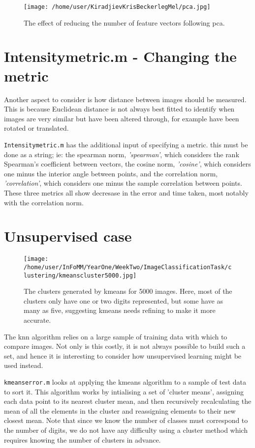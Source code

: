 \documentclass[12pt]{article}
\begin{document}
\begin{figure}
  \texttt{[image: /home/user/KiradjievKrisBeckerlegMel/pca.jpg]}
  \caption{The effect of reducing the number of feature vectors following pca.}
  \label{fig:errorfeat}
\end{figure}

\section{Intensitymetric.m - Changing the metric}

Another aspect to consider is how distance between images should be measured. This is because Euclidean distance is not always best fitted to identify when images are very similar but have been altered through, for example have been rotated or translated.

\texttt{Intensitymetric.m} has the additional input of specifying a metric. this must be done as a string; ie: the spearman norm, \emph{'spearman'}, which considers the rank Spearman's coefficient between vectors, the cosine norm, \emph{'cosine'}, which considers one minus the interior angle between points, and the correlation norm, \emph{'correlation'}, which considers one minus the sample correlation between points. These three metrics all show decresase in the error and time taken, most notably with the correlation norm.

\section{Unsupervised case}

\begin{figure}[ht]
  \texttt{[image: /home/user/InFoMM/YearOne/WeekTwo/ImageClassificationTask/clustering/kmeanscluster5000.jpg]}
  \caption{The clusters generated by kmeans for 5000 images. Here, most of the clusters only have one or two digits represented, but some have as many as five, suggesting kmeans needs refining to make it more accurate.}
  \label{fig:cluster}
\end{figure}

The knn algorithm relies on a large sample of training data with which to compare images. Not only is this costly, it is not always possible to build such a set, and hence it is interesting to consider how unsupervised learning might be used instead.

\texttt{kmeanserror.m} looks at applying the kmeans algorithm to a sample of test data to sort it. This algorithm works by intialising a set of 'cluster means', assigning each data point to its nearest cluster mean, and then recursively recalculating the mean of all the elements in the cluster and reassigning elements to their new closest mean. Note that since we know the number of classes must correspond to the number of digits, we do not have any difficulty using a cluster method which requires knowing the number of clusters in advance. 
\end{document}
